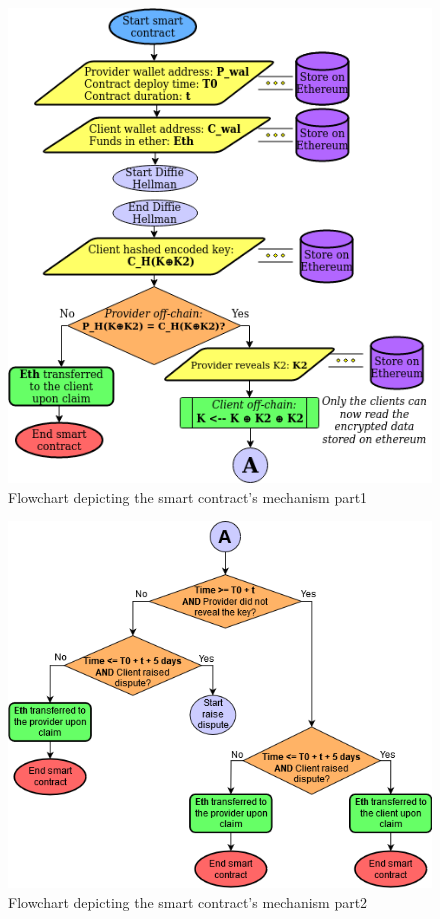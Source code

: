 \documentclass[conference]{IEEEtran}
\begin{document}
\begin{figure}[htp]
\centering
\includegraphics[width=\linewidth]{General mechanism.png}
 \caption{Flowchart depicting the smart contract's mechanism part1}
 \label{fig:Smart-Contract-Mechanism}
\end{figure}
 
\begin{figure}[htp]
\centering
\includegraphics[width=\linewidth]{General mechanism 2.png}
 \caption{Flowchart depicting the smart contract's mechanism part2}
 \label{fig:Smart-Contract-Mechanism-2}
\end{figure}
\end{document}
